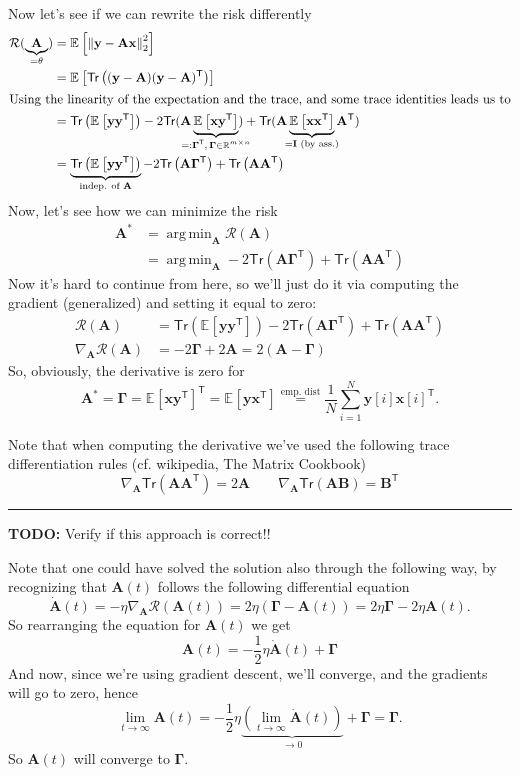 \documentclass[a2paper,8pt]{extarticle}
\newcommand{\R}{\mathbb{R}}
\newcommand{\cR}{\mathcal{R}}
\newcommand{\norm}[1]{\left\lVert #1 \right\rVert}
\newcommand{\Tr}[1]{\mathsf{Tr}\left( #1 \right)}
\newcommand{\sTr}[1]{\mathsf{Tr}( #1 )}
\newcommand{\Exp}[2][]{{\mathbb{E}_{#1}}\left[ #2
\right]}
\newcommand*{\T}{\mathsf{T}}
\DeclareMathOperator*{\argmin}{arg\,min}
\newcommand{\mat}[1]{\mathbf{#1}}
\renewcommand{\vec}[1]{\mathbf{#1}}
\newcommand{\vx}{\vec{x}}
\newcommand{\vy}{\vec{y}}
\newcommand{\MA}{\mat{A}}
\newcommand{\MB}{\mat{B}}
\newcommand{\MI}{\mat{I}}
\newcommand{\MGamma}{\mat{\Gamma}}
\newcommand{\todo}[1]{\textbf{TODO:} #1}
\newcommand{\todo}[1]{%
}
\newcommand{\sep}{\vspace{0pt}\noindent\hrule\vspace{0pt}}
\newcommand{\ssep}{\hdashrule[1.1ex]{\linewidth}{0.1pt}{0.3mm}\vspace{-6pt}}
\newcommand{\sep}{\vspace{5pt}\noindent\hrule\vspace{5pt}}
\newcommand{\ssep}{\hdashrule[1.1ex]{\linewidth}{0.1pt}{0.3mm}\vspace{-3pt}}
\begin{document}
\begin{landscape}
\begin{multicols*}{7}
Now let's see if we can rewrite the risk differently
\begin{gather*}
\begin{align*}
\cR(\underbrace{\MA}_{=\theta})
&=
\Exp{\norm{\vy-\MA\vx}_2^2}
\\
&=
\Exp{\Tr{(\vy-\MA)(\vy-\MA)^\T}}
\\
\shortintertext{Using the linearity of the expectation and the trace, and some
trace identities leads us to}
&=
\Tr{\Exp{\vy\vy^\T}}
-2\sTr{\MA\underbrace{\Exp{\vx\vy^\T}}_{\mathclap{=:\MGamma^\T,\,\MGamma\in\R^{m\times
n}}}} +\sTr{\MA\underbrace{\Exp{\vx\vx^\T}}_{\mathclap{=\MI\text{ (by
ass.)}}}\MA^\T}
\\
&=
\underbrace{\Tr{\Exp{\vy\vy^\T}}}_{\mathclap{\text{indep. of }\MA}}
-2\Tr{\MA\MGamma^\T}
+\Tr{\MA\MA^\T}
\end{align*}
\end{gather*}
Now, let's see how we can minimize the risk
\begin{align*}
\MA^*
&=
\argmin_{\MA}
\cR(\MA)
\\
&=
\argmin_{\MA}
-2\Tr{\MA\MGamma^\T}
+\Tr{\MA\MA^\T}
\end{align*}
Now it's hard to continue from here, so we'll just do it via computing the
gradient (generalized) and setting it equal to zero:
\begin{align*}
\cR(\MA)
&=
\Tr{\Exp{\vy\vy^\T}}
-2\Tr{\MA\MGamma^\T}
+\Tr{\MA\MA^\T}
\\
\nabla_{\MA}\cR(\MA)
&=
-2\MGamma + 2\MA
=2(\MA-\MGamma)
\end{align*}
So, obviously, the derivative is zero for 
\[
\MA^*=\MGamma
=\Exp{\vx\vy^\T}^\T
=\Exp{\vy\vx^\T}
\stackrel{\text{emp. dist}}{=}
\frac{1}{N}\sum_{i=1}^N\vy[i]\vx[i]^\T.
\]

\ssep

Note that when computing the derivative we've used the following trace
differentiation rules (cf. wikipedia, The Matrix Cookbook)
\[
\nabla_{\MA}\Tr{\MA\MA^\T}=2\MA
\qquad
\nabla_{\MA}\Tr{\MA\MB}=\MB^\T
\]

\sep

\todo{Verify if this approach is correct!!}

Note that one could have solved the solution also through the following way, by
recognizing that $\MA(t)$ follows the following differential equation
\[
\dot{\MA}(t)=-\eta\nabla_{\MA}\cR(\MA(t))
=2\eta(\MGamma-\MA(t))
=2\eta\MGamma - 2\eta\MA(t).
\]
So rearranging the equation for $\MA(t)$ we get
\[
\MA(t)=-\frac{1}{2}\eta\dot{\MA}(t)+\MGamma
\]
And now, since we're using gradient descent, we'll converge, and the gradients
will go to zero, hence
\[
\lim_{t\to\infty}\MA(t)
=
-\frac{1}{2}
\eta
\underbrace{\left(\lim_{t\to\infty}\dot{\MA}(t)\right)}_{\to 0}
+\MGamma
=\MGamma.
\]
So $\MA(t)$ will converge to $\MGamma$.


\end{multicols*}
\end{landscape}
\end{document}
